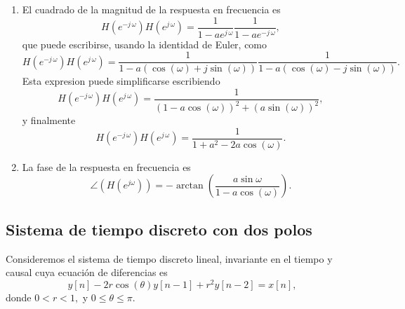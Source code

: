 \begin{enumerate}
\item  El cuadrado de la magnitud de la respuesta en frecuencia es
\begin{equation}
H\left( e^{-j \, \omega }\right) H\left( e^{j \, \omega }\right) =
\frac{1}{1-ae^{j \, \omega }}\frac{1}{1-ae^{-j \, \omega }},
\end{equation}
que puede escribirse, usando la identidad de Euler, como
\begin{equation}
H\left( e^{-j \, \omega }\right) H\left( e^{j \, \omega }\right) =
\frac{1}{1-a\left( \cos \left( \omega \right) +j\sin \left( \omega \right) \right) }
\frac{1}{1-a\left( \cos \left( \omega \right) -j\sin \left( \omega \right) \right) }.
\end{equation}
Esta expresion puede simplificarse escribiendo
\begin{equation}
H\left( e^{-j \, \omega }\right) H\left( e^{j \, \omega }\right) =
\frac{1}{\left(1-a\cos \left( \omega \right) \right) ^{2}+
\left( a\sin \left( \omega\right) \right) ^{2}},
\end{equation}
y finalmente
\begin{equation}
H\left( e^{-j \, \omega }\right) H\left( e^{j \, \omega }\right) =
\frac{1}{1+a^{2}-2a\cos \left( \omega \right) }.
\end{equation}

\item  La fase de la respuesta en frecuencia es
\begin{equation}
\angle (H(e^{j \omega})) = -\arctan \left( \frac{a\sin \omega }{1-a\cos \left( \omega \right) }\right) .
\end{equation}
\end{enumerate}

\subsection{Sistema de tiempo discreto con dos polos}

Consideremos el sistema de tiempo discreto lineal, invariante en el tiempo y
causal cuya ecuaci\'{o}n de diferencias es
\begin{equation}
y\left[ n\right] -2r\cos \left( \theta \right) y\left[ n-1\right] +r^{2}y%
\left[ n-2\right] =x\left[ n\right] ,
\end{equation}
donde $0<r<1,$ y $0\leq \theta \leq \pi .$

